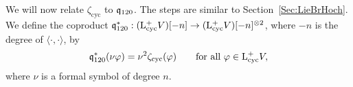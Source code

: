 \documentclass[\MainFolder/Text.tex]{subfiles}
\begin{document}
%
We will now relate $\zeta_{\text{cyc}}$ to $\mathfrak{q}_{120}$. The steps are similar to Section~\ref{Sec:LieBrHoch}. We define the coproduct $\mathfrak{q}_{120}^*: (\mathrm{L}^+_{\mathrm{cyc}} V)[-n] \rightarrow (\mathrm{L}^+_{\mathrm{cyc}} V)[-n]^{\otimes 2}$, where $-n$ is the degree of $\langle\cdot,\cdot\rangle$, by 
\begin{equation}\label{Eq:CoprCandid}
\mathfrak{q}_{120}^*(\nu\varphi) = \nu^2\zeta_{\text{cyc}}(\varphi)\qquad\text{for all }\varphi\in \mathrm{L}^+_{\mathrm{cyc}} V,
\end{equation}
where $\nu$ is a formal symbol of degree $n$.
\end{document}
